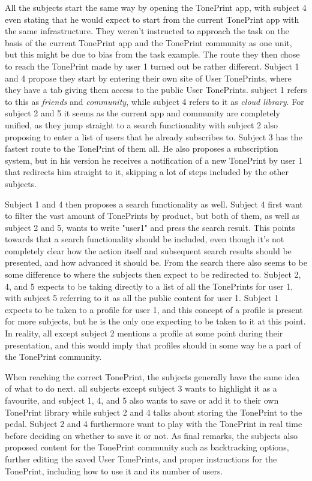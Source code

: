 All the subjects start the same way by opening the TonePrint app, with subject 4 even stating that he would expect to start from the current TonePrint app with the same infrastructure. They weren't instructed to approach the task on the basis of the current TonePrint app and the TonePrint community as one unit, but this might be due to bias from the task example. The route they then chose to reach the TonePrint made by user 1 turned out be rather different. Subject 1 and 4 propose they start by entering their own site of User TonePrints, where they have a tab giving them access to the public User TonePrints. subject 1 refers to this as \textit{friends} and \textit{community}, while subject 4 refers to it as \textit{cloud library}. For subject 2 and 5 it seems as the current app and community are completely unified, as they jump straight to a search functionality with subject 2 also proposing to enter a list of users that he already subscribes to. Subject 3 has the fastest route to the TonePrint of them all. He also proposes a subscription system, but in his version he receives a notification of a new TonePrint by user 1 that redirects him straight to it, skipping a lot of steps included by the other subjects.

Subject 1 and 4 then proposes a search functionality as well. Subject 4 first want to filter the vast amount of TonePrints by product, but both of them, as well as subject 2 and 5, wants to write "user1" and press the search result. This points towards that a search functionality should be included, even though it's not completely clear how the action itself and subsequent search results should be presented, and how advanced it should be. From the search there also seems to be some difference to where the subjects then expect to be redirected to. Subject 2, 4, and 5 expects to be taking directly to a list of all the TonePrints for user 1, with subject 5 referring to it as all the public content for user 1. Subject 1 expects to be taken to a profile for user 1, and this concept of a profile is present for more subjects, but he is the only one expecting to be taken to it at this point. In reality, all except subject 2 mentions a profile at some point during their presentation, and this would imply that profiles should in some way be a part of the TonePrint community.

When reaching the correct TonePrint, the subjects generally have the same idea of what to do next. all subjects except subject 3 wants to highlight it as a favourite, and subject 1, 4, and 5 also wants to save or add it to their own TonePrint library while subject 2 and 4 talks about storing the TonePrint to the pedal. Subject 2 and 4 furthermore want to play with the TonePrint in real time before deciding on whether to save it or not. As final remarks, the subjects also proposed content for the TonePrint community such as backtracking options, further editing the saved User TonePrints, and proper instructions for the TonePrint, including how to use it and its number of users.



